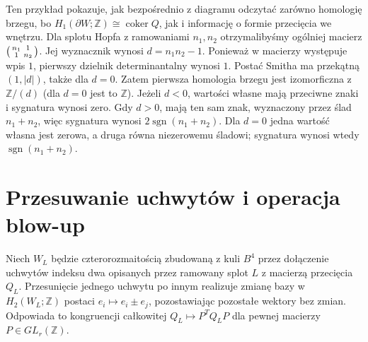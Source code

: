 \begin{przyklad}
Ten przykład pokazuje, jak bezpośrednio z diagramu odczytać zarówno
homologię brzegu, bo $H_1(\partial W;\mathbb Z)\cong\operatorname{coker}Q$,
jak i informację o formie przecięcia we wnętrzu. Dla splotu Hopfa
z ramowaniami $n_1,n_2$ otrzymalibyśmy ogólniej macierz
$\begin{psmallmatrix}n_1&1\\1&n_2\end{psmallmatrix}$.
Jej wyznacznik wynosi $d=n_1n_2-1$.
Ponieważ w macierzy występuje wpis $1$,
pierwszy dzielnik determinantalny wynosi $1$.
Postać Smitha ma przekątną $(1,|d|)$, także
dla $d=0$. Zatem pierwsza homologia brzegu
jest izomorficzna z $\mathbb Z/(d)$ (dla
$d=0$ jest to $\mathbb Z$).
Jeżeli $d<0$, wartości własne mają przeciwne
znaki i sygnatura wynosi zero. Gdy $d>0$,
mają ten sam znak, wyznaczony przez ślad
$n_1+n_2$, więc sygnatura wynosi
$2\operatorname{sgn}(n_1+n_2)$. Dla $d=0$
jedna wartość własna jest zerowa, a druga
równa niezerowemu śladowi; sygnatura wynosi
wtedy $\operatorname{sgn}(n_1+n_2)$.
\end{przyklad}

\section{Przesuwanie uchwytów i operacja blow-up}
\label{sec:kt-slides}

\begin{stwierdzenie}
\label{st:kt-handle-slide}
Niech $W_L$ będzie czterorozmaitością zbudowaną z kuli
$B^4$ przez dołączenie uchwytów indeksu dwa opisanych
przez ramowany splot $L$ z macierzą przecięcia $Q_L$.
Przesunięcie jednego uchwytu po innym realizuje zmianę
bazy w $H_2(W_L;\mathbb Z)$ postaci
$e_i\mapsto e_i\pm e_j$, pozostawiając pozostałe
wektory bez zmian. Odpowiada to kongruencji całkowitej
$Q_L\mapsto P^TQ_LP$ dla pewnej macierzy
$P\in GL_r(\mathbb Z)$.
\end{stwierdzenie}

